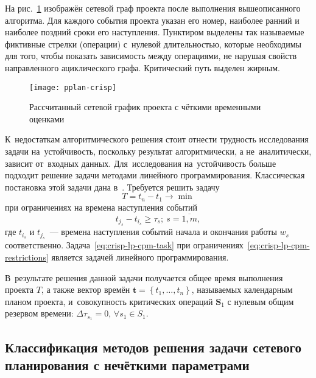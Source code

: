 На рис.~\ref{fig:pplan-crisp} изображён сетевой граф проекта после выполнения вышеописанного алгоритма. Для каждого события проекта указан его номер, наиболее ранний и наиболее поздний сроки его наступления. Пунктиром выделены так называемые фиктивные стрелки (операции) с~нулевой длительностью, которые необходимы для того, чтобы показать зависимость между операциями, не нарушая свойств направленного ациклического графа. Критический путь выделен жирным.
\begin{figure}[h!]
  \centering
  {
    \texttt{[image: pplan-crisp]}
    \caption{Рассчитанный сетевой график проекта с чёткими временными оценками}
    \label{fig:pplan-crisp}
  }
\end{figure}

К~недостаткам алгоритмического решения стоит отнести трудность исследования задачи на~устойчивость, поскольку результат алгоритмически, а не~аналитически, зависит от~входных данных. Для~исследования на~устойчивость больше подходит решение задачи методами линейного программирования. Классическая постановка этой задачи дана в~\cite{Kosorukov_Mischenko}. Требуется решить задачу
\begin{equation}
\label{eq:crisp-lp-cpm-task}
  T=t_n-t_1 \to \min
\end{equation}
при ограничениях на времена наступления событий
\begin{equation}
\label{eq:crisp-lp-cpm-restrictions}
  t_{j_s}-t_{i_s}\geqslant \tau_s;\ s=\overline{1,m},
\end{equation}
где $t_{i_s}$ и $t_{j_s}$~--- времена наступления событий начала и окончания работы $w_s$ соответственно. Задача~\eqref{eq:crisp-lp-cpm-task} при ограничениях~\eqref{eq:crisp-lp-cpm-restrictions} является задачей линейного программирования.

В~результате решения данной задачи получается общее время выполнения проекта $T$, а также вектор времён $\mathbf{t}=\left\{ t_1, \ldots, t_n \right\}$, называемых календарным планом проекта, и~совокупность критических операций $\mathbf{S}_1$ с нулевым общим резервом времени: $\Delta \tau_{s_1}=0$, $\forall s_1 \in S_1$.

\subsection{Классификация методов решения задачи сетевого планирования с нечёткими параметрами}

